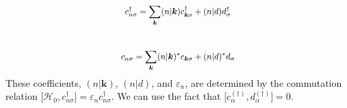 \documentclass[a4j]{jarticle}
\begin{document}
\begin{align}
	\hspace{49mm}
	c^{\dagger}_{n \sigma}
	=
	\sum_{\bm{k}}
	( n | \bm{k} )
	c^{\dagger}_{\bm{k} \sigma}
	+
	( n | d )
	d^{\dagger}_{\sigma}
	\hspace{49mm}
\end{align}
\\[-12mm]
\begin{align}
	\hspace{47.4mm}
	c_{n \sigma}
	=
	\sum_{\bm{k}}
	( n | \bm{k} )^{*}
	c_{\bm{k} \sigma}
	+
	( n | d )^{*}
	d_{\sigma}
	\hspace{47.2mm}
\end{align}
These coefficients, $( n | \bm{k} )$, $( n | d )$, and $\varepsilon_{n}$, are determined by the commutation relation $\displaystyle \big[ \mathcal{H}_{0} , c^{\dagger}_{n \sigma} \big] = \varepsilon_{n} c^{\dagger}_{n \sigma} $.
We can use the fact that $
	\big[
		c^{(\dagger)}_{\alpha},d^{(\dagger)}_{\alpha}
		\big]
	=
	0$.
\end{document}

